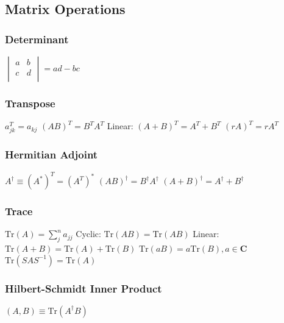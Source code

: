 \subsection{Matrix Operations}

\subsubsection{Determinant}
\begin{itemize}
\itemt \(
\begin{vmatrix}
a	& b	\\
c	& d \\
\end{vmatrix}
= ad-bc
\)
\end{itemize}

\subsubsection{Transpose}			
\begin{itemize}
\itemt \( a^T_{jk} = a_{kj} \)
\itemt \( (AB)^T = B^T A^T \)
\itemt Linear: \( (A+B)^T = A^T+B^T \)
\itemt \( (rA)^T=rA^T \)
\end{itemize}		

\subsubsection{Hermitian Adjoint}			
\begin{itemize}
\itemt \( A^\dagger \equiv (A^*)^T = (A^T)^* \)
\itemt \( (AB)^\dagger = B^\dagger A^\dagger \)
\itemt \( (A+B)^\dagger = A^\dagger +B^\dagger \)
\end{itemize}

\subsubsection{Trace}			
\begin{itemize}
\itemt \( \mathrm{Tr} (A) = \sum\limits_{j}^{n} a_{jj} \)
\itemt Cyclic: \( \mathrm{Tr} (AB) = \mathrm{Tr} (AB) \)
\itemt Linear: \( \mathrm{Tr} (A+B) = \mathrm{Tr} (A)+\mathrm{Tr} (B) \)
\subitem \hspace*{1cm} \( \mathrm{Tr} (aB) = a \mathrm{Tr} (B) , a \in \mathbf{C} \)
\itemt \( \mathrm{Tr} (SAS^{-1}) = \mathrm{Tr} (A) \)
\end{itemize}

\subsubsection{Hilbert-Schmidt Inner Product}			
\begin{itemize}
\itemt \( (A,B) \equiv \mathrm{Tr} (A^{\dagger}B) \)
\end{itemize}

